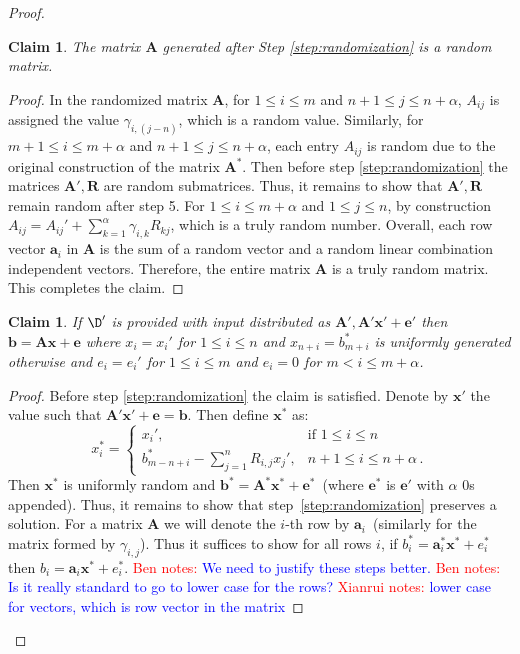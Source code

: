 \documentclass[11pt]{article}
\newcommand{\vect}[1]{\ensuremath{\textbf{#1}}}
\newtheorem{claim}[theorem]{Claim}
\newcommand{\authnote}[2]{{\textcolor{red}{\textsf{#1 notes: }\textcolor{blue}{ #2}}\marginpar{\textcolor{red}{\textbf{!!!!!}}}}}
\newcommand{\authnote}[2]{}
\newcommand{\bnote}[1]{{\authnote{Ben}{#1}}}
\newcommand{\xnote}[1]{{\authnote{Xianrui}{#1}}}
\newcommand{\ve}{\vect{e}}
\newcommand{\vA}{\vect{A}}
\newcommand{\vx}{\vect{x}}
\newcommand{\va}{\vect{a}}
\newcommand{\vb}{\vect{b}}
\begin{document}
{\begin{proof}
\begin{claim}
\label{cl:randomMatrixDist}
The matrix $\vA$ generated after Step \ref{step:randomization} is a random matrix.
\end{claim}
\begin{proof}
In the randomized matrix $\vect{A}$, for $1\le i \le m$ and $n+1\le j \le n+\alpha$, $A_{ij}$ is assigned the value $\gamma_{i,(j - n)}$, which is a random value.  Similarly, for $m+1\le i \le m+\alpha$ and $n+1\le j \le n+\alpha$, each entry $A_{ij}$ is random due to the original construction of the matrix $\vA^*$.  Then before step \ref{step:randomization} the matrices $\vA', \vect{R}$ are random submatrices.  Thus, it remains to show that $\vA', \vect{R}$ remain random after step 5. For $1\le i \le m+\alpha$ and $1\le j \le n$, by construction $A_{ij} = A_{ij}'+\sum_{k=1}^\alpha \gamma_{i, k} R_{kj}$, which is a truly random number. Overall, each row vector $\va_{i}$ in $\vA$ is the sum of a random vector and a random linear combination independent vectors. Therefore, the entire matrix $\vA$ is a truly random matrix.  This completes the claim.
\end{proof}
\begin{claim}
\label{cl:random ax+e}
If $\D'$ is provided with input distributed as $\vA', \vA'\vx'+\ve'$ then $\vb = \vA \vx+\ve$ where $x_i = x_i'$ for $1\leq i \leq n$ and $x_{n+i} = b_{m+i}^*$ is uniformly generated otherwise and  $e_i = e_i'$ for $1\leq i\leq m$ and $e_i = 0$ for $m<i\leq m+\alpha$.
\end{claim}
\begin{proof}
Before step \ref{step:randomization} the claim is satisfied.  Denote by $\vx'$ the value such that $\vA'\vx'+\ve = \vb$.  
Then define $\vx^*$ as:
\[
x^*_i = \begin{cases}
x_i', & \text{if }1\leq i\leq n \\
b_{m-n+i}^*-\sum_{j=1}^n R_{i, j} x_j', & n+1\leq i\leq n+\alpha\,.
\end{cases}
\]
Then $\vx^*$ is uniformly random and $\vb^* = \vA^*\vx^* + \ve^*$~(where $\ve^*$ is $\ve'$ with $\alpha$ 0s appended).  Thus, it remains to show that step~\ref{step:randomization} preserves a solution.
For a matrix $\vA$ we will denote the $i$-th row by $\va_i$~(similarly for the matrix formed by $\gamma_{i,j}$).  Thus it suffices to show for all rows $i$, if $b_i^* = \va^*_i \vx^*+e^*_i$  then $b_i = \va_i \vx^* + e^*_i$.
\bnote{We need to justify these steps better.}
\bnote{Is it really standard to go to lower case for the rows?}
\xnote{lower case for vectors, which is row vector in the matrix}



\end{proof}
\end{proof}}
\end{document}
